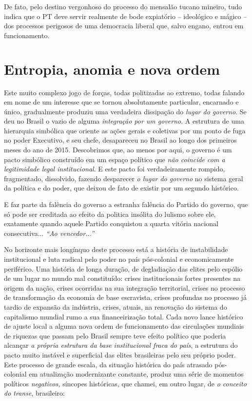 De fato, pelo destino vergonhoso do processo do mensalão tucano mineiro,
tudo indica que o PT deve servir realmente de bode expiatório --
ideológico e mágico -- dos processos perigosos de uma democracia liberal
que, salvo engano, entrou em funcionamento.

  \section{Entropia, anomia e nova
  ordem}\label{entropia-anomia-e-nova-ordem}

Este muito complexo jogo de forças, todas politizadas ao extremo, todas
falando em nome de um interesse que se tornou absolutamente particular,
encarnado e único, gradualmente produziu uma verdadeira dissipação do
\emph{lugar do governo}. Se deu no Brasil o vazio de alguma
\emph{integração por um governo}. A estrutura de uma hierarquia
simbólica que oriente as ações gerais e coletivas por um ponto de fuga
no poder Executivo, e seu chefe, desapareceu no Brasil ao longo dos
primeiros meses do ano de 2015. Descobrimos que, ao menos por aqui, o
governo é um pacto simbólico construído em um espaço político que
\emph{não coincide com a legitimidade legal institucional}. E este pacto
foi verdadeiramente rompido, fragmentado, dissolvido, fazendo desparecer
\emph{o lugar do governo} no sistema geral da política e do poder, que
deixou de fato de existir por um segundo histórico.

E faz parte da falência do governo a estranha falência do Partido do
governo, que só pode ser creditada ao efeito da politica insólita do
lulismo sobre ele, exatamente quando aquele Partido conquistou a quarta
vitória nacional consecutiva... \emph{``Ao vencedor...''}

No horizonte mais longínquo deste processo está a história de
instabilidade institucional e luta radical pelo poder no país
pós-colonial e economicamente periférico. Uma história de longa duração,
de degladiação das elites pelo espólio de um lugar no mundo mal
constituído: crises institucionais fortes presentes na origem da nação,
crises ocorridas na sua integração territorial, crises no processo de
transformação da economia de base escravista, crises profundas no
processo já tardio de expansão da indústria, crises, atuais, na
renovação do sistema do capitalismo mundial rumo a sua financeirização
total. Cada novo lance histórico de ajuste local a alguma nova ordem de
funcionamento das circulações mundiais de riquezas que passam pelo
Brasil sempre teve efeito político que poderia alcançar \emph{a própria
estrutura da base institucional fraca do país}, a estrutura do pacto
muito instável e superficial das elites brasileiras pelo seu próprio
poder. Este processo de grande escala, da situação histórica do país
atrasado pós-colonial em atualização modernizante constante, produz uma
série de momentos políticos \emph{negativos,} síncopes históricas, que
chamei, em outro lugar, de \emph{o conceito do transe}, brasileiro:

